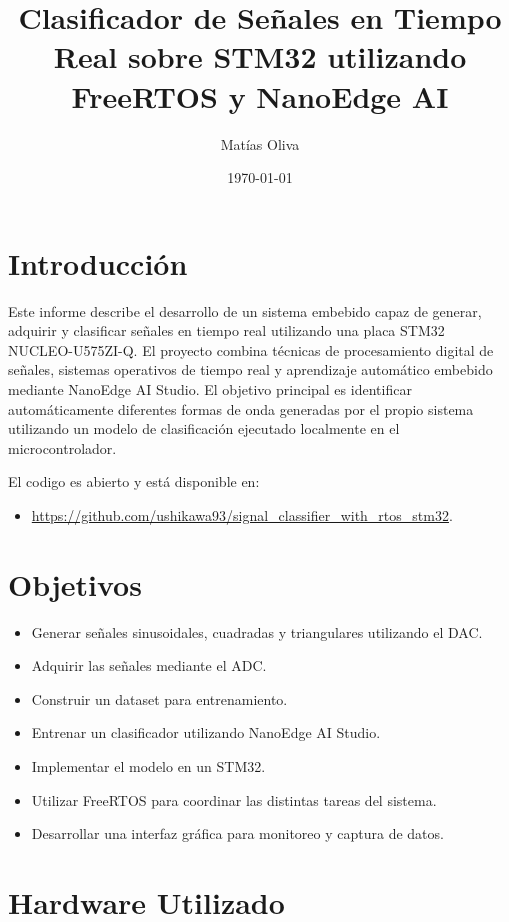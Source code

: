 \documentclass[a4paper,11pt]{article}
\title{Clasificador de Señales en Tiempo Real sobre STM32 utilizando FreeRTOS y NanoEdge AI}
\author{Matías Oliva}
\date{\today}
\begin{document}
\maketitle

\tableofcontents
\newpage

\section{Introducción}

Este informe describe el desarrollo de un sistema embebido capaz de generar, adquirir y clasificar señales en tiempo real utilizando una placa STM32 NUCLEO-U575ZI-Q. El proyecto combina técnicas de procesamiento digital de señales, sistemas operativos de tiempo real y aprendizaje automático embebido mediante NanoEdge AI Studio. El objetivo principal es identificar automáticamente diferentes formas de onda generadas por el propio sistema utilizando un modelo de clasificación ejecutado localmente en el microcontrolador. 

El codigo es abierto y está disponible en:

\begin{itemize}
	\item \url{https://github.com/ushikawa93/signal_classifier_with_rtos_stm32}.
\end{itemize}
 
\section{Objetivos}

\begin{itemize}
\item Generar señales sinusoidales, cuadradas y triangulares utilizando el DAC.
\item Adquirir las señales mediante el ADC.
\item Construir un dataset para entrenamiento.
\item Entrenar un clasificador utilizando NanoEdge AI Studio.
\item Implementar el modelo en un STM32.
\item Utilizar FreeRTOS para coordinar las distintas tareas del sistema.
\item Desarrollar una interfaz gráfica para monitoreo y captura de datos.
\end{itemize}

\section{Hardware Utilizado}
\end{document}
